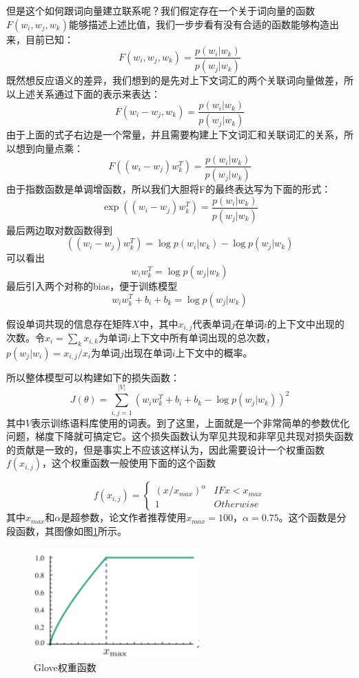 \documentclass[twoside,a4paper,12pt]{book}%
\begin{document}
但是这个如何跟词向量建立联系呢？我们假定存在一个关于词向量的函数$F(w_i,w_j,w_k)$能够描述上述比值，我们一步步看有没有合适的函数能够构造出来，目前已知：
$$
F(w_i,w_j,w_k)=\frac{p(w_i|w_k)}{p(w_j|w_k)}
$$
既然想反应语义的差异，我们想到的是先对上下文词汇的两个关联词向量做差，所以上述关系通过下面的表示来表达：
$$
F(w_i-w_j,w_k)=\frac{p(w_i|w_k)}{p(w_j|w_k)}
$$
由于上面的式子右边是一个常量，并且需要构建上下文词汇和关联词汇的关系，所以想到向量点乘：
$$
F((w_i-w_j) w_k^T)=\frac{p(w_i|w_k)}{p(w_j|w_k)}
$$
由于指数函数是单调增函数，所以我们大胆将F的最终表达写为下面的形式：
$$
\exp{((w_i-w_j) w_k^T)}=\frac{p(w_i|w_k)}{p(w_j|w_k)}
$$
最后两边取对数函数得到
$$
((w_i-w_j) w_k^T)=\log{p(w_i|w_k)}-\log{p(w_j|w_k)}
$$
可以看出
$$
w_i w_k^T = \log{{p(w_j|w_k)}}
$$
最后引入两个对称的bias，便于训练模型
$$
w_iw_k^T + b_i + b_k = \log{{p(w_j|w_k)}}
$$

假设单词共现的信息存在矩阵$X$中，其中$x_{i,j}$代表单词$j$在单词$i$的上下文中出现的次数。令$x_i=\sum_{k}{x_{i,k}}$为单词$i$上下文中所有单词出现的总次数，$p(w_j|w_i)=x_{i,j}/x_i$为单词$j$出现在单词$i$上下文中的概率。

所以整体模型可以构建如下的损失函数：
$$
J(\theta) = \sum_{i,j=1}^{|V|}{(w_i  w_k^T + b_i + b_k - \log{{p(w_j|w_k)}})^2}
$$
其中$V$表示训练语料库使用的词表。到了这里，上面就是一个非常简单的参数优化问题，梯度下降就可搞定它。这个损失函数认为罕见共现和非罕见共现对损失函数的贡献是一致的，但是事实上不应该这样认为，因此需要设计一个权重函数$f(x_{i,j})$，这个权重函数一般使用下面的这个函数

$$
	f(x_{i,j}) = \left \{ \begin{array}{ll}
                	(x/x_{max})^\alpha & IF  x<x_{max}\\
			1 &Otherwise
             \end{array}       \right .          
$$
其中$x_{max}$和$\alpha$是超参数，论文作者推荐使用$x_{max}=100$，$\alpha=0.75$。这个函数是分段函数，其图像如图\ref{fig:glove1}所示。
\begin{figure}[htbp]
\begin{center}
\includegraphics[width=2.5in]{figures/glove1.png}
\caption{Glove权重函数}\label{fig:glove1}
\end{center}
\end{figure}
\end{document}
